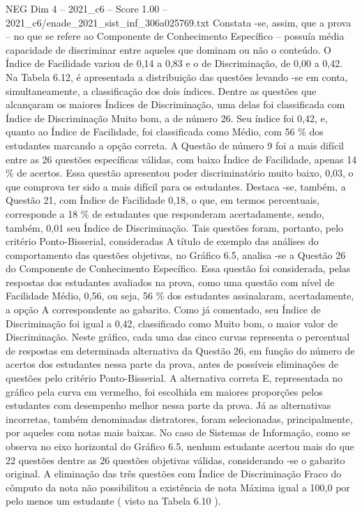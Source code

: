 \begin{textsample}{NEG Dim 4 – 2021\_c6 – Score 1.00 – 2021\_c6/enade\_2021\_sist\_inf\_306a025769.txt}
Constata -se, assim, que a prova – no que se refere ao Componente de Conhecimento Específico – possuía média capacidade de discriminar entre aqueles que dominam ou não o conteúdo.
O Índice de Facilidade variou de 0,14 a 0,83 e o de Discriminação, de 0,00 a 0,42.
Na Tabela 6.12, é apresentada a distribuição das questões levando -se em conta, simultaneamente, a classificação dos dois índices.
Dentre as questões que alcançaram os maiores Índices de Discriminação, uma delas foi classificada com Índice de Discriminação Muito bom, a de número 26.
Seu índice foi 0,42, e, quanto ao Índice de Facilidade, foi classificada como Médio, com 56 \% dos estudantes marcando a opção correta.
A Questão de número 9 foi a mais difícil entre as 26 questões específicas válidas, com baixo Índice de Facilidade, apenas 14 \% de acertos.
Essa questão apresentou poder discriminatório muito baixo, 0,03, o que comprova ter sido a mais difícil para os estudantes.
Destaca -se, também, a Questão 21, com Índice de Facilidade 0,18, o que, em termos percentuais, corresponde a 18 \% de estudantes que responderam acertadamente, sendo, também, 0,01 seu Índice de Discriminação.
Tais questões foram, portanto, pelo critério Ponto-Bisserial, consideradas A título de exemplo das análises do comportamento das questões objetivas, no Gráfico 6.5, analisa -se a Questão 26 do Componente de Conhecimento Específico.
Essa questão foi considerada, pelas respostas dos estudantes avaliados na prova, como uma questão com nível de Facilidade Médio, 0,56, ou seja, 56 \% dos estudantes assinalaram, acertadamente, a opção A correspondente ao gabarito.
Como já comentado, seu Índice de Discriminação foi igual a 0,42, classificado como Muito bom, o maior valor de Discriminação.
Neste gráfico, cada uma das cinco curvas representa o percentual de respostas em determinada alternativa da Questão 26, em função do número de acertos dos estudantes nessa parte da prova, antes de possíveis eliminações de questões pelo critério Ponto-Bisserial.
A alternativa correta E, representada no gráfico pela curva em vermelho, foi escolhida em maiores proporções pelos estudantes com desempenho melhor nessa parte da prova.
Já as alternativas incorretas, também denominadas distratores, foram selecionadas, principalmente, por aqueles com notas mais baixas.
No caso de Sistemas de Informação, como se observa no eixo horizontal do Gráfico 6.5, nenhum estudante acertou mais do que 22 questões dentre as 26 questões objetivas válidas, considerando -se o gabarito original.
A eliminação das três questões com Índice de Discriminação Fraco do cômputo da nota não possibilitou a existência de nota Máxima igual a 100,0 por pelo menos um estudante ( visto na Tabela 6.10 ).

\end{textsample}
